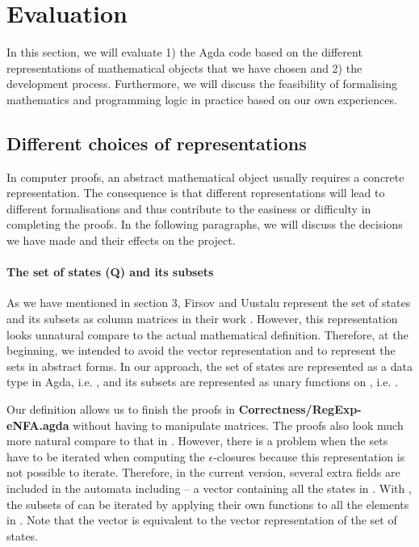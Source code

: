 \section{Evaluation}
\par In this section, we will evaluate 1) the Agda code based on the
different representations of mathematical objects that we have chosen and 2) the
development process. Furthermore, we will discuss the feasibility of
formalising mathematics and programming logic in practice based on our own experiences. 


\subsection{Different choices of representations}
\par In computer proofs, an abstract mathematical
object usually requires a concrete representation. The consequence is that different representations will lead to different
formalisations and thus contribute to the
easiness or difficulty in completing the proofs. In the
following paragraphs, we will discuss the decisions we have made and
their effects on the project. 

\paragraph{The set of states (Q) and its subsets} As we have mentioned
in section 3, Firsov and Uustalu represent the set of states  and its subsets
as column matrices in their work \cite{firsov2013}. However, this representation looks unnatural compare
to the actual mathematical definition. Therefore, at the beginning, we intended to avoid the vector representation and to
represent the sets in abstract forms. In our approach, the set of states are represented as a data type in Agda, i.e. , and its
subsets are represented as unary functions on , i.e. . 

\par Our definition allows us to finish the proofs in
\textbf{Correctness/RegExp-eNFA.agda} without having to
manipulate matrices. The proofs also look much more natural compare to that in
\cite{firsov2013}. However, there is a problem when the sets have to be iterated when computing the 
\(\epsilon\)-closures because this representation is not possible to
iterate. Therefore, in the current version, several extra fields are included in the automata
including  -- a vector containing all the states in . With , the subsets
of  can be iterated by applying their own functions  to all the elements in . Note that the
vector  is equivalent to the vector representation of the set of
states. 

